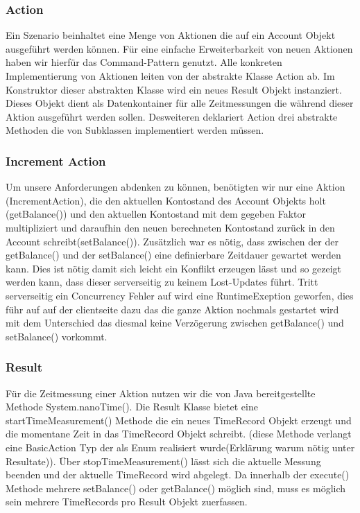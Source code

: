 \subsubsection{Action}
\label{sec:action}
Ein Szenario beinhaltet eine Menge von Aktionen die auf ein Account Objekt ausgeführt werden können. Für eine einfache Erweiterbarkeit von neuen Aktionen haben wir hierfür das Command-Pattern genutzt. Alle konkreten Implementierung von Aktionen leiten von der abstrakte Klasse Action ab. Im Konstruktor  dieser abstrakten Klasse wird ein neues Result Objekt instanziert. Dieses Objekt dient als Datenkontainer für alle Zeitmessungen die während dieser Aktion ausgeführt werden sollen. Desweiteren deklariert Action drei abstrakte Methoden die von Subklassen implementiert werden müssen.
 
\subsubsection{Increment Action}
\label{sec:incrementAction}
Um unsere Anforderungen abdenken zu können, benötigten wir nur eine Aktion (IncrementAction), die den aktuellen Kontostand des Account Objekts holt (getBalance()) und den aktuellen Kontostand mit dem gegeben Faktor multipliziert und daraufhin den neuen berechneten Kontostand zurück in den Account schreibt(setBalance()). Zusätzlich war es nötig, dass zwischen der der getBalance() und der setBalance() eine definierbare Zeitdauer gewartet werden kann. Dies ist nötig damit sich leicht ein Konflikt erzeugen lässt und so gezeigt werden kann, dass dieser serverseitig zu keinem Lost-Updates führt. Tritt serverseitig ein Concurrency Fehler auf wird eine RuntimeExeption geworfen, dies führ auf auf der clientseite dazu das die ganze Aktion nochmals gestartet wird mit dem Unterschied das diesmal keine Verzögerung zwischen getBalance() und setBalance() vorkommt.

\subsubsection{Result}
\label{sec:result}
Für die Zeitmessung einer Aktion nutzen wir die von Java bereitgestellte Methode System.nanoTime(). Die Result Klasse bietet eine startTimeMeasurement() Methode die ein neues TimeRecord Objekt erzeugt und die momentane Zeit in das TimeRecord Objekt schreibt. (diese Methode verlangt eine BasicAction Typ der als Enum realisiert wurde(Erklärung warum nötig unter Resultate)). Über stopTimeMeasurement() lässt sich die aktuelle Messung beenden und der aktuelle TimeRecord wird abgelegt. Da innerhalb der execute() Methode mehrere setBalance() oder getBalance() möglich sind, muss es möglich sein mehrere TimeRecords pro Result Objekt zuerfassen.




